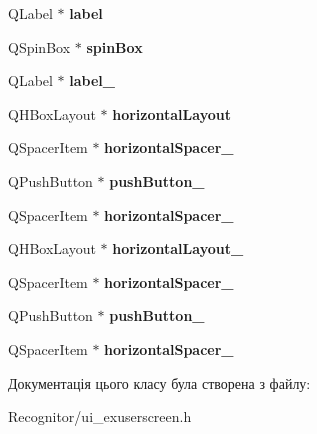 \begin{DoxyCompactItemize}
\item 
\hypertarget{classUi__ExUserScreen_a08610c46bda078007e266a0114e87c46}{Q\-Label $\ast$ {\bfseries label}}\label{classUi__ExUserScreen_a08610c46bda078007e266a0114e87c46}

\item 
\hypertarget{classUi__ExUserScreen_acb6b67a5f6a98bb5a38e9da2df4b90ad}{Q\-Spin\-Box $\ast$ {\bfseries spin\-Box}}\label{classUi__ExUserScreen_acb6b67a5f6a98bb5a38e9da2df4b90ad}

\item 
\hypertarget{classUi__ExUserScreen_a3f3aace85c5958d49cf01abc322c1c0a}{Q\-Label $\ast$ {\bfseries label\-\_}}\label{classUi__ExUserScreen_a3f3aace85c5958d49cf01abc322c1c0a}

\item 
\hypertarget{classUi__ExUserScreen_a57c74958dd021562bf9296e391bf3386}{Q\-H\-Box\-Layout $\ast$ {\bfseries horizontal\-Layout}}\label{classUi__ExUserScreen_a57c74958dd021562bf9296e391bf3386}

\item 
\hypertarget{classUi__ExUserScreen_adbce90d079cc94fe5fb3a19180a753d9}{Q\-Spacer\-Item $\ast$ {\bfseries horizontal\-Spacer\-\_}}\label{classUi__ExUserScreen_adbce90d079cc94fe5fb3a19180a753d9}

\item 
\hypertarget{classUi__ExUserScreen_a52208971ad1d9aaff96cc192c1cfed4c}{Q\-Push\-Button $\ast$ {\bfseries push\-Button\-\_}}\label{classUi__ExUserScreen_a52208971ad1d9aaff96cc192c1cfed4c}

\item 
\hypertarget{classUi__ExUserScreen_a00fc93a7a296b0d4032385ec557d90bd}{Q\-Spacer\-Item $\ast$ {\bfseries horizontal\-Spacer\-\_}}\label{classUi__ExUserScreen_a00fc93a7a296b0d4032385ec557d90bd}

\item 
\hypertarget{classUi__ExUserScreen_a1cc3b3f069a5696b4b6b95e93c291ad0}{Q\-H\-Box\-Layout $\ast$ {\bfseries horizontal\-Layout\-\_}}\label{classUi__ExUserScreen_a1cc3b3f069a5696b4b6b95e93c291ad0}

\item 
\hypertarget{classUi__ExUserScreen_a090712ed1aa86ee8e4c16b8d0e2ddc51}{Q\-Spacer\-Item $\ast$ {\bfseries horizontal\-Spacer\-\_}}\label{classUi__ExUserScreen_a090712ed1aa86ee8e4c16b8d0e2ddc51}

\item 
\hypertarget{classUi__ExUserScreen_ab7fb20aec7398fa9b47ebdf3b72ddfdc}{Q\-Push\-Button $\ast$ {\bfseries push\-Button\-\_}}\label{classUi__ExUserScreen_ab7fb20aec7398fa9b47ebdf3b72ddfdc}

\item 
\hypertarget{classUi__ExUserScreen_a8b56100f54c59eb996f402781d98743b}{Q\-Spacer\-Item $\ast$ {\bfseries horizontal\-Spacer\-\_}}\label{classUi__ExUserScreen_a8b56100f54c59eb996f402781d98743b}

\end{DoxyCompactItemize}


Документація цього класу була створена з файлу\-:\begin{DoxyCompactItemize}
\item 
Recognitor/ui\-\_\-exuserscreen.\-h\end{DoxyCompactItemize}
